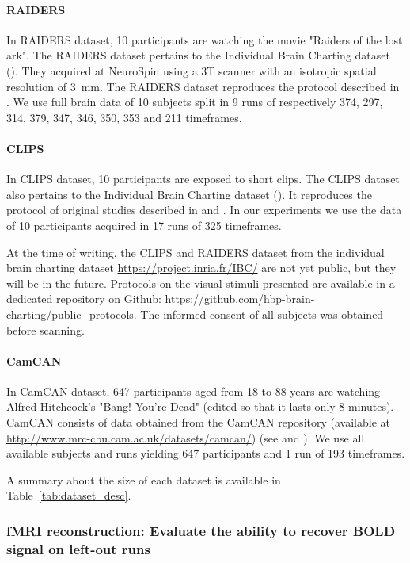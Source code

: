 \documentclass{report}
\begin{document}
{\paragraph{RAIDERS}
In RAIDERS dataset, 10 participants are watching the movie "Raiders of the lost ark".
% 
The RAIDERS dataset pertains to the Individual Brain Charting dataset (\cite{ibc}).
% 
They acquired at NeuroSpin using a 3T scanner with an isotropic spatial resolution of 3 mm.
% 
The RAIDERS dataset reproduces the protocol described in \cite{haxby2011common}.
%
We use full brain data of 10 subjects split in 9 runs of respectively 374, 297, 314, 379, 347, 346, 350, 353 and 211 timeframes.

\paragraph{CLIPS}
In CLIPS dataset, 10 participants are exposed to short clips. 
%
The CLIPS dataset also pertains to the Individual Brain Charting dataset (\cite{ibc}).
%
It reproduces the protocol of original studies described in \cite{nishimoto2011reconstructing} and \cite{huth2012continuous}.
%
In our experiments we use the data of 10 participants acquired in 17 runs of 325 timeframes.

At the time of writing, the CLIPS and RAIDERS dataset from the individual brain charting dataset \url{https://project.inria.fr/IBC/} are not yet public, but they will be in the future. Protocols on the visual stimuli presented are available in a dedicated repository on Github: \url{https://github.com/hbp-brain-charting/public_protocols}. The informed consent of all subjects was obtained before scanning.

\paragraph{CamCAN}
In CamCAN dataset, 647 participants aged from 18 to 88 years are watching Alfred Hitchcock's "Bang! You're Dead" (edited so that it lasts only 8 minutes).
%
CamCAN consists of data obtained from the CamCAN repository (available at \url{http://www.mrc-cbu.cam.ac.uk/datasets/camcan/}) (see \cite{taylor2017cambridge} and \cite{shafto2014cambridge}).
%
We use all available subjects and runs yielding 647 participants and 1 run of 193 timeframes.

A summary about the size of each dataset is available in Table~\ref{tab:dataset_desc}.


\subsubsection{fMRI reconstruction: Evaluate the ability to recover BOLD signal on left-out runs}
\label{reconstruction}

}
\end{document}
